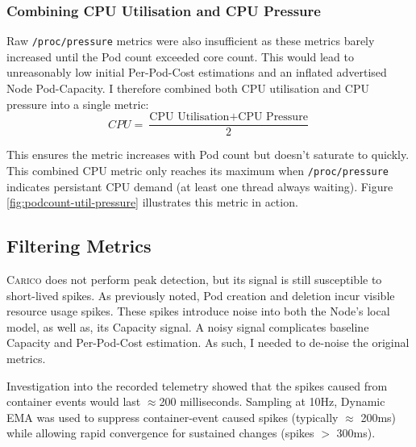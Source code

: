 \subsubsection{Combining CPU Utilisation and CPU Pressure}
Raw \verb|/proc/pressure| metrics were also insufficient as these metrics
barely increased until the Pod count exceeded core count. This would lead to
unreasonably low initial Per-Pod-Cost estimations and an inflated advertised Node
Pod-Capacity. I therefore combined both CPU utilisation and CPU pressure
into a single metric:
\[ CPU = \frac{\text{CPU Utilisation} + \text{CPU Pressure}}{2} \]

This ensures the metric increases with Pod count but doesn't saturate to
quickly. This combined CPU metric only reaches its maximum when \verb|/proc/pressure|
indicates persistant CPU demand (at least one thread always waiting). Figure
\ref{fig:podcount-util-pressure} illustrates this metric in action.

\subsection{Filtering Metrics}
\textsc{Carico} does not perform peak detection, but its signal is still
susceptible to short-lived spikes. As previously noted,  Pod creation and
deletion incur visible resource usage spikes. These spikes introduce noise
into both the Node's local model, as well as, its Capacity signal. A noisy
signal complicates baseline Capacity and Per-Pod-Cost estimation. As such, I
needed to de-noise the original metrics.

Investigation into the recorded telemetry showed that the spikes caused from
container events would last $\approx$200 milliseconds. Sampling at
10Hz, Dynamic EMA was used to suppress container-event caused spikes (typically
$\approx$ 200ms) while allowing rapid convergence for sustained changes (spikes
$>$ 300ms).

